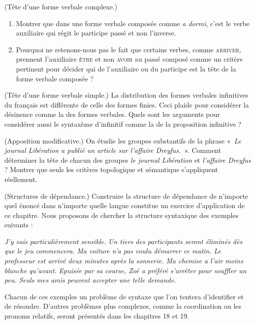 {     (Tête d'une forme verbale complexe.)
    \begin{enumerate}[label=\alph*.]
    \item Montrer que dans une forme verbale composée comme \textit{a dormi}, c’est le verbe auxiliaire qui régit le participe passé et non l’inverse.
    \item Pourquoi ne retenons-nous pas le fait que certains verbes, comme \textsc{arriver}, prennent l’auxiliaire \textsc{être} et non \textsc{avoir} au passé composé comme un critère pertinent pour décider qui de l’auxiliaire ou du participe est la tête de la forme verbale composée ?
    \end{enumerate}

     (Tête d'une forme verbale simple.) La distribution des formes verbales infinitives du français est différente de celle des formes finies. Ceci plaide pour considérer la désinence comme la  des formes verbales. Quels sont les arguments pour considérer aussi le syntaxème d’infinitif comme la  de la proposition infinitive ?

     (Apposition modificative.) On étudie les groupes substantifs de la phrase «~\textit{Le journal Libération a publié un article sur l’affaire Dreyfus.}~». Comment déterminer la tête de chacun des groupes \textit{le journal Libération} et \textit{l’affaire Dreyfus} ? Montrer que seuls les critères topologique et sémantique s’appliquent réellement.

 
     (Structures de dépendance.) Construire la structure de dépendance de n’importe quel énoncé dans n’importe quelle langue constitue un exercice d’application de ce chapitre. Nous proposons de chercher la structure syntaxique des exemples suivants :

    \begin{exe}
          \textit{J’y suis particulièrement sensible.}
          \textit{Un tiers des participants seront éliminés dès que le jeu commencera.}
          \textit{Ma voiture n’a pas voulu démarrer ce matin.}
          \textit{Le professeur est arrivé deux minutes après la sonnerie.}
          \textit{Ma chemise a l’air moins blanche qu’avant.}
          \textit{Epuisée par sa course, Zoé a préféré s’arrêter pour souffler un peu.}
          \textit{Seuls mes amis peuvent accepter une telle demande.}
    \end{exe}
    Chacun de ces exemples un problème de syntaxe que l’on tentera d’identifier et de résoudre. D’autres problèmes plus complexes, comme la coordination ou les pronoms relatifs, seront présentés dans les chapitres 18 et 19.%

}
